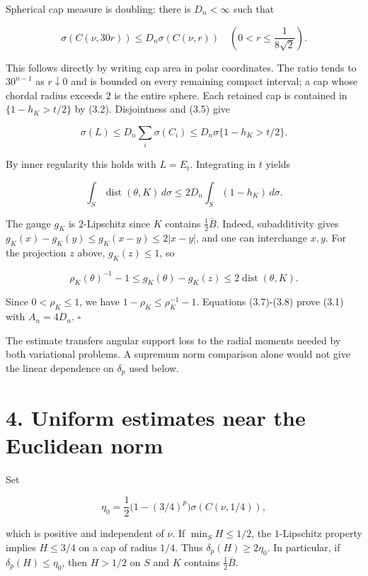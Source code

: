 \documentclass[11pt]{article}
\begin{document}
Spherical cap measure is doubling: there is \(D_n<\infty\) such that

\[
\sigma(C(\nu,30r))\leq D_n\sigma(C(\nu,r))
\quad\left(0<r\leq\frac{1}{8\sqrt2}\right).
\tag{3.5}
\]

This follows directly by writing cap area in polar coordinates. The
ratio tends to \(30^{n-1}\) as \(r\downarrow0\) and is bounded on every
remaining compact interval; a cap whose chordal radius exceeds \(2\) is
the entire sphere. Each retained cap is contained in \(\{1-h_K>t/2\}\)
by (3.2). Disjointness and (3.5) give

\[
\sigma(L)\leq D_n\sum_i\sigma(C_i)
\leq D_n\sigma\{1-h_K>t/2\}.
\tag{3.6}
\]

By inner regularity this holds with \(L=E_t\). Integrating in \(t\)
yields

\[
\int_S\operatorname{dist}(\theta,K)\,d\sigma
\leq2D_n\int_S(1-h_K)\,d\sigma.
\tag{3.7}
\]

The gauge \(g_K\) is \(2\)-Lipschitz since \(K\) contains
\(\tfrac12\overline B\). Indeed, subadditivity gives
\(g_K(x)-g_K(y)\leq g_K(x-y)\leq2|x-y|\), and one can interchange
\(x,y\). For the projection \(z\) above, \(g_K(z)\leq1\), so

\[
\rho_K(\theta)^{-1}-1
\leq g_K(\theta)-g_K(z)
\leq2\operatorname{dist}(\theta,K).
\tag{3.8}
\]

Since \(0<\rho_K\leq1\), we have \(1-\rho_K\leq\rho_K^{-1}-1\).
Equations (3.7)-(3.8) prove (3.1) with \(A_n=4D_n\). \(\square\)

The estimate transfers angular support loss to the radial moments needed
by both variational problems. A supremum norm comparison alone would not
give the linear dependence on \(\delta_p\) used below.

\section{4. Uniform estimates near the Euclidean
norm}\label{uniform-estimates-near-the-euclidean-norm}

Set

\[
\eta_0=\frac12\bigl(1-(3/4)^p\bigr)\sigma(C(\nu,1/4)),
\tag{4.1}
\]

which is positive and independent of \(\nu\). If \(\min_SH\leq1/2\), the
\(1\)-Lipschitz property implies \(H\leq3/4\) on a cap of radius
\(1/4\). Thus \(\delta_p(H)\geq2\eta_0\). In particular, if
\(\delta_p(H)\leq\eta_0\), then \(H>1/2\) on \(S\) and \(K\) contains
\(\tfrac12\overline B\).
\end{document}

